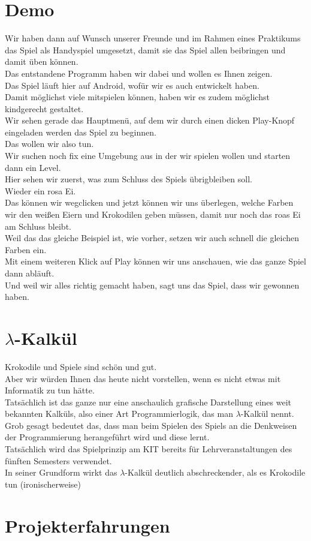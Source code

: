 \documentclass{scrartcl}
\begin{document}
	\section{Demo}
	Wir haben dann auf Wunsch unserer Freunde und im Rahmen eines Praktikums das Spiel als Handyspiel umgesetzt, damit sie das Spiel allen beibringen und damit üben können.\\
	Das entstandene Programm haben wir dabei und wollen es Ihnen zeigen.\\
	Das Spiel läuft hier auf Android, wofür wir es auch entwickelt haben.\\
	Damit möglichst viele mitspielen können, haben wir es zudem möglichst kindgerecht gestaltet.\\
	Wir sehen gerade das Hauptmenü, auf dem wir durch einen dicken Play-Knopf eingeladen werden das Spiel zu beginnen.\\
	Das wollen wir also tun.\\
	Wir suchen noch fix eine Umgebung aus in der wir spielen wollen und starten dann ein Level.\\
	Hier sehen wir zuerst, was zum Schluss des Spiels übrigbleiben soll.\\
	Wieder ein rosa Ei.\\
	Das können wir wegclicken und jetzt können wir uns überlegen, welche Farben wir den weißen Eiern und Krokodilen geben müssen, damit nur noch das roas Ei am Schluss bleibt.\\
	Weil das das gleiche Beispiel ist, wie vorher, setzen wir auch schnell die gleichen Farben ein.\\
	Mit einem weiteren Klick auf Play können wir uns anschauen, wie das ganze Spiel dann abläuft.\\
	Und weil wir alles richtig gemacht haben, sagt uns das Spiel, dass wir gewonnen haben.\\
	
	\section{$\lambda$-Kalkül}
	Krokodile und Spiele sind schön und gut.\\
	Aber wir würden Ihnen das heute nicht vorstellen, wenn es nicht etwas mit Informatik zu tun hätte.\\
	Tatsächlich ist das ganze nur eine anschaulich grafische Darstellung eines weit bekannten Kalküls, also einer Art Programmierlogik, das man $\lambda$-Kalkül nennt.\\
	Grob gesagt bedeutet das, dass man beim Spielen des Spiels an die Denkweisen der Programmierung herangeführt wird und diese lernt.\\
	Tatsächlich wird das Spielprinzip am KIT bereits für Lehrveranstaltungen des fünften Semesters verwendet.\\
	In seiner Grundform wirkt das $\lambda$-Kalkül deutlich abschreckender, als es Krokodile tun (ironischerweise)\\
	
	\section{Projekterfahrungen}
	
\end{document}
